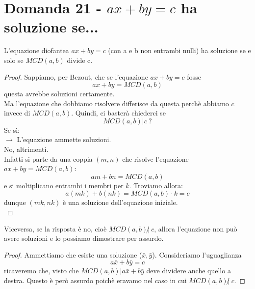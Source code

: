 \documentclass[]{article}
\begin{document}
\section{Domanda 21 - $ax+by=c$ ha soluzione se...}
\begin{lem}
L'equazione diofantea $ax+by=c$ (con a e b non entrambi nulli) ha soluzione se e solo se $MCD(a,b)$ divide c.
\end{lem}
\begin{proof}
Sappiamo, per Bezout, che se l'equazione $ax+by=c$ fosse $$ax+by=MCD(a,b)$$ questa avrebbe soluzioni certamente.\\Ma l'equazione che dobbiamo risolvere differisce da questa perchè abbiamo $c$ invece di $MCD(a,b)$. Quindi, ci basterà chiederci se $$MCD(a,b) | c\ ?$$
Se sì:\\
$\rightarrow$ L'equazione ammette soluzioni.\\
No, altrimenti.\\
Infatti si parte da una coppia $(m,n)$ che risolve l'equazione $ax+by=MCD(a,b)$: $$am+bn=MCD(a,b)$$ e si moltiplicano entrambi i membri per $k$. Troviamo allora: $$a(mk)+b(nk)=MCD(a,b)\cdot k = c$$ dunque $(mk,nk)$ è una soluzione dell'equazione iniziale.\\ \end{proof}
Viceversa, se la risposta è no, cioè $MCD(a,b)\not|\ c$, allora l'equazione non può avere soluzioni e lo possiamo dimostrare per assurdo. 
\begin{proof}
Ammettiamo che esiste una soluzione ($ \bar{x}, \bar{y}$). Consideriamo l'uguaglianza $$a\bar{x}+b\bar{y}=c$$ ricaveremo che, visto che $MCD(a,b) | a\bar{x}+b\bar{y}$ deve dividere anche quello a destra. Questo è però assurdo poichè eravamo nel caso in cui $MCD(a,b)\not|\ c$.
\end{proof}
\end{document}
